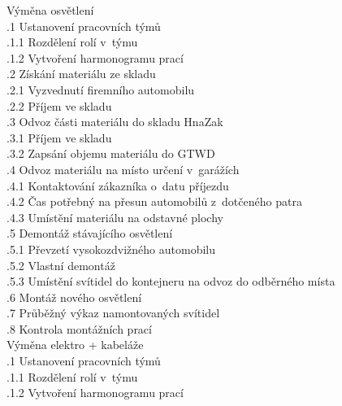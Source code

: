 \documentclass[a4paper, twoside, 11pt]{article}
\begin{document}
	 Výměna osvětlení\\
		\indent {}.1 Ustanovení pracovních týmů\\
			\indent \indent {}.1.1 Rozdělení rolí v~týmu\\
			\indent \indent {}.1.2 Vytvoření harmonogramu prací\\
		\indent {}.2 Získání materiálu ze skladu\\
			\indent \indent {}.2.1 Vyzvednutí firemního automobilu\\
			\indent \indent {}.2.2 Příjem ve skladu\\
		\indent {}.3 Odvoz části materiálu do skladu HnaZak\\
			\indent \indent {}.3.1 Příjem ve skladu\\
			\indent \indent {}.3.2 Zapsání objemu materiálu do GTWD\\
		\indent {}.4 Odvoz materiálu na místo určení v~garážích\\
			\indent \indent {}.4.1 Kontaktování zákazníka o~datu příjezdu\\
			\indent \indent {}.4.2 Čas potřebný na přesun automobilů z~dotčeného patra\\
			\indent \indent {}.4.3 Umístění materiálu na odstavné plochy\\
		\indent {}.5 Demontáž stávajícího osvětlení\\
			\indent \indent {}.5.1 Převzetí vysokozdvižného automobilu\\
			\indent \indent {}.5.2 Vlastní demontáž\\
			\indent \indent {}.5.3 Umístění svítidel do kontejneru na odvoz do odběrného místa\\
		\indent {}.6 Montáž nového osvětlení\\
		\indent {}.7 Průběžný výkaz namontovaných svítidel\\
		\indent {}.8 Kontrola montážních prací\\
							



	 Výměna elektro + kabeláže\\
		\indent {}.1 Ustanovení pracovních týmů\\
			\indent \indent {}.1.1 Rozdělení rolí v~týmu\\
			\indent \indent {}.1.2 Vytvoření harmonogramu prací\\
\end{document}
